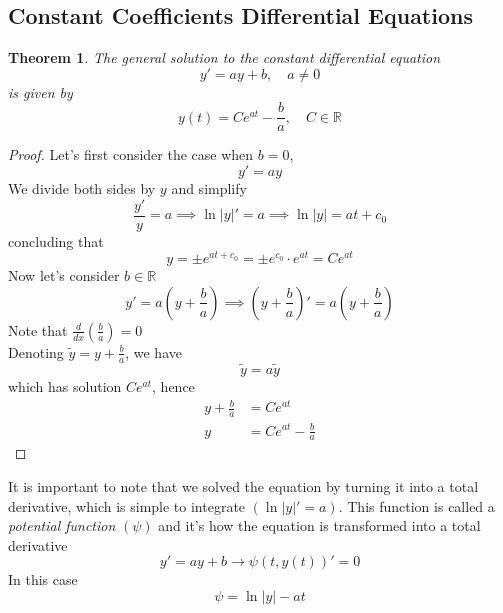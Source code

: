 \documentclass{article}
\newtheorem*{theorem1}{Theorem}
\begin{document}
\pagebreak

\subsection{Constant Coefficients Differential Equations}

\begin{theorem1}
    The general solution to the constant differential equation
    \[
        y' = ay+b,
        \quad a \neq 0
    \]
    is given by
    \[
        y(t)=Ce^{at}-\frac{b}{a}, \quad C \in \mathbb{R}
    \]
\end{theorem1}
\begin{proof}
    Let's first consider the case when \(b=0\),
    \[
        y'=ay
    \]
    We divide both sides by \(y\) and simplify
    \[
        \frac{y'}{y}=a
        \implies
        \ln|y|'=a
        \implies
        \ln|y|=at+c_0
    \]
    concluding that
    \[
        y = \pm e^{at+c_0}=\pm e^{c_0} \cdot e^{at} = Ce^{at}
    \]
    Now let's consider \(b \in \mathbb{R}\)
    \[
        y'=a\left(y+\frac{b}{a}\right)
        \implies
        \left(y + \frac{b}{a}\right)' = a\left(y + \frac{b}{a}\right)
    \]
    Note that \(\frac{d}{dx}\left(\frac{b}{a}\right)=0\) \\
    Denoting \(\tilde{y}=y+\frac{b}{a}\), we have
    \[
        \tilde{y}=a\tilde{y}
    \]
    which has solution \(Ce^{at}\), hence
    \begin{align*}
        y+\frac{b}{a}&=Ce^{at} \\
        y &= Ce^{at} - \frac{b}{a}
    \end{align*}
\end{proof}

\pagebreak

It is important to note that we solved the equation by turning
it into a total derivative, which is simple to integrate \((\ln|y|'=a)\).
This function is called a \textit{potential function} \((\psi)\) and it's how
the equation is transformed into a total derivative
\[
    y'=ay+b \rightarrow \psi(t, y(t))'=0
\]
In this case
\[
    \psi = \ln|y| - at
\]
\end{document}
